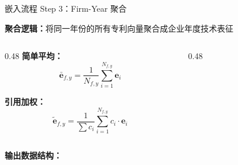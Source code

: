 \documentclass[aspectratio=169]{beamer}
\begin{document}
\begin{frame}{嵌入流程 Step 3：Firm-Year 聚合}

\textbf{聚合逻辑：}将同一年份的所有专利向量聚合成企业年度技术表征

\vspace{0.3cm}

\begin{columns}[T]
\begin{column}{0.48\textwidth}
\textbf{简单平均：}
\begin{equation*}
\bar{\mathbf{e}}_{f,y} = \frac{1}{N_{f,y}} \sum_{i=1}^{N_{f,y}} \mathbf{e}_i
\end{equation*}

\vspace{0.2cm}

\textbf{引用加权：}
\begin{equation*}
\tilde{\mathbf{e}}_{f,y} = \frac{1}{\sum c_i} \sum_{i=1}^{N_{f,y}} c_i \cdot \mathbf{e}_i
\end{equation*}
\end{column}

\begin{column}{0.48\textwidth}
\end{column}
\end{columns}

\vspace{0.4cm}

\textbf{输出数据结构：}


\end{frame}
\end{document}
